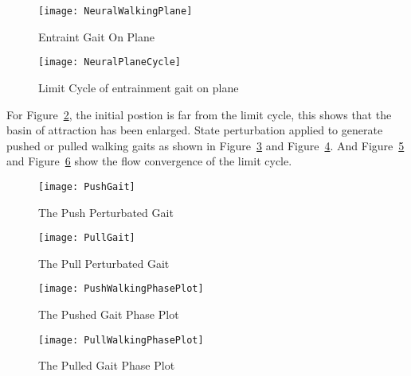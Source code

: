 \begin{figure}[!htbp]
  \begin{center}
     \texttt{[image: NeuralWalkingPlane]}
    \caption{Entraint Gait On Plane}
    \label{fig:neuralwalkinggait}
\end{center}
\end{figure}

\begin{figure}[!htbp]
  \begin{center}
      \texttt{[image: NeuralPlaneCycle]}
    \caption{Limit Cycle of entrainment gait on plane}
    \label{fig:entrainmentLimitCycleOnPlane}
\end{center}
\end{figure}



For Figure~\ref{fig:entrainmentLimitCycleOnPlane}, the initial postion is far from the limit cycle, this shows that the basin of attraction has been enlarged.
State perturbation applied to generate pushed or pulled walking gaits as shown in Figure~\ref{fig:PushGait} and Figure~\ref{fig:PullGait}.
And Figure~\ref{fig:PushGaitPlot} and Figure~\ref{fig:PullGaitPhasePlot} show the flow convergence of the limit cycle.

\begin{figure}[!htbp]
  \begin{center}
      \texttt{[image: PushGait]}
    \caption{The Push Perturbated Gait}
    \label{fig:PushGait}
\end{center}
\end{figure}


\begin{figure}[!htbp]
  \begin{center}
      \texttt{[image: PullGait]}
    \caption{The Pull Perturbated Gait}
    \label{fig:PullGait}
\end{center}
\end{figure}


\begin{figure}[!htbp]
  \begin{center}
      \texttt{[image: PushWalkingPhasePlot]}
    \caption{The Pushed Gait Phase Plot}
    \label{fig:PushGaitPlot}
\end{center}
\end{figure}


\begin{figure}[!htbp]
  \begin{center}
      \texttt{[image: PullWalkingPhasePlot]}
    \caption{The Pulled Gait Phase Plot}
    \label{fig:PullGaitPhasePlot}
\end{center}
\end{figure}


